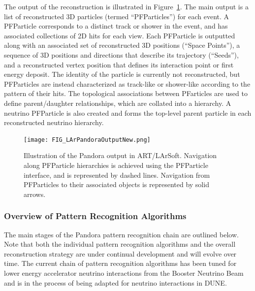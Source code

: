 The output of the reconstruction is illustrated in Figure~\ref{larsoft_output}. The main output is a list of reconstructed 3D particles (termed ``PFParticles'') for each event. A PFParticle corresponds to a distinct track or shower in the event, and has associated collections of 2D hits for each view. Each PFParticle is outputted along with an associated set of reconstructed 3D positions (``Space Points''), a sequence of 3D positions and directions that describe its trajectory (``Seeds''), and a reconstructed vertex position that defines its interaction point or first energy deposit. The identity of the particle is currently not reconstructed, but PFParticles are instead characterized as track-like or shower-like according to the pattern of their hits. The topological associations between PFarticles are used to define parent/daughter relationships, which are collated into a hierarchy. A neutrino PFParticle is also created and forms the top-level parent particle in each reconstructed neutrino hierarchy.

\begin{figure}[!h!tbp]
\centering
\texttt{[image: FIG\_LArPandoraOutputNew.png]}
\caption{Illustration of the Pandora output in ART/LArSoft. Navigation along PFParticle hierarchies is achieved using the PFParticle interface, and is represented by dashed lines. Navigation from PFParticles to their associated objects is represented by solid arrows. }
\label{larsoft_output}
\end{figure}

\subsubsection{Overview of Pattern Recognition Algorithms}

The main stages of the Pandora pattern recognition chain are outlined below. Note that both the individual pattern recognition algorithms and the overall reconstruction strategy are under continual development and will evolve over time. The current chain of pattern recognition algorithms has been tuned for lower energy accelerator neutrino interactions from the Booster Neutrino Beam and is in the process of being adapted for neutrino interactions in DUNE.


